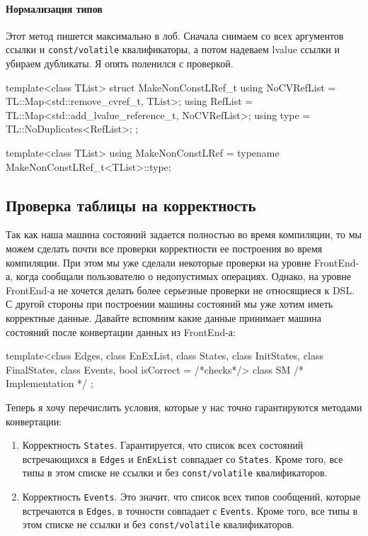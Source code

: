 \documentclass{article}
\begin{document}
{\paragraph{Нормализация типов}

Этот метод пишется максимально в лоб.
Сначала снимаем со всех аргументов ссылки и \verb"const/volatile" квалификаторы, а потом надеваем lvalue ссылки и убираем дубликаты.
Я опять поленился с проверкой.
\begin{cppcode}[\nonumbers]
template<class TList>
struct MakeNonConstLRef_t {
  using NoCVRefList = TL::Map<std::remove_cvref_t, TList>;
  using RefList = TL::Map<std::add_lvalue_reference_t, NoCVRefList>;
  using type = TL::NoDuplicates<RefList>;
};

template<class TList>
using MakeNonConstLRef = typename MakeNonConstLRef_t<TList>::type;
\end{cppcode}

\subsection{Проверка таблицы на корректность}

Так как наша машина состояний задается полностью во время компиляции, то мы можем сделать почти все проверки корректности ее построения во время компиляции.
При этом мы уже сделали некоторые проверки на уровне FrontEnd-а, когда сообщали пользователю о недопустимых операциях.
Однако, на уровне FrontEnd-а не хочется делать более серьезные проверки не относящиеся к DSL.
С другой стороны при построении машины состояний мы уже хотим иметь корректные данные.
Давайте вспомним какие данные принимает машина состояний после конвертации данных из FrontEnd-а:
\begin{cppcode}[\nonumbers]
template<class Edges, class EnExList, class States, class InitStates,
         class FinalStates, class Events, bool isCorrect = /*checks*/>
class SM {
  /* Implementation */
};
\end{cppcode}
Теперь я хочу перечислить условия, которые у нас точно гарантируются методами конвертации:
\begin{enumerate}
\item Корректность \verb"States".
Гарантируется, что список всех состояний встречающихся в \verb"Edges" и \verb"EnExList" совпадает со \verb"States".
Кроме того, все типы в этом списке не ссылки и без \verb"const/volatile" квалификаторов.

\item Корректность \verb"Events".
Это значит, что список всех типов сообщений, которые встречаются в \verb"Edges", в точности совпадает с \verb"Events".
Кроме того, все типы в этом списке не ссылки и без \verb"const/volatile" квалификаторов.


\end{enumerate}}
\end{document}
